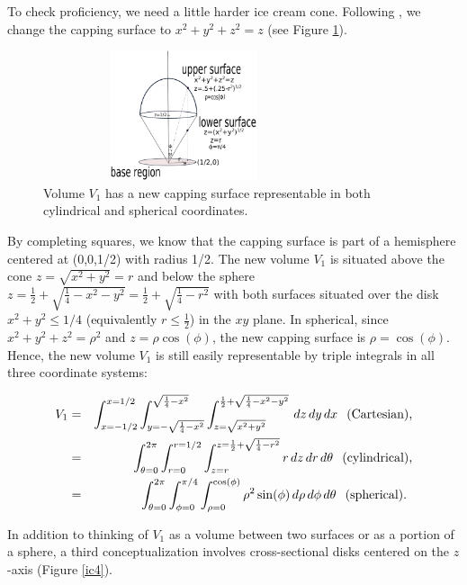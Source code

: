 \documentclass[12pt,fleqn]{article}
\begin{document}
To check proficiency, we need a little harder ice cream cone. Following  \cite{S}, we change the capping surface  to $x^2+y^2+z^2=z$ (see Figure \ref{ic3}).


\begin{figure}[h]
    \centering
        \includegraphics [width=3.25in, height=1.5in]{ic3.eps}
    \caption{Volume $V_1$ has a new capping surface representable in both cylindrical and spherical coordinates.}
    \label{ic3}
\end{figure}

{\flushleft By} completing squares, we know that the capping surface  is part of a hemisphere centered at (0,0,1/2) with radius 1/2.
The new volume $V_1$ is situated above the cone  $z=\sqrt{x^2+y^2}=r$ and below the sphere $z=\frac {1}{2}+\sqrt{\frac{1}{4}-x^2-y^2}=\frac{1}{2}+\sqrt{\frac{1}{4}-r^2}$ with both surfaces situated over the disk $x^2+y^2 \le 1/4$ (equivalently $r\le\frac{1}{2}$) in the $xy$ plane.
In spherical, since $x^2+y^2+z^2=\rho^2$ and $z=\rho\cos(\phi)$, the new capping surface is $\rho=\cos(\phi)$. Hence, the new volume $V_1$ is still easily representable by triple integrals in all three coordinate systems:

\begin{eqnarray}
V_1&=& \int_{x=-1/2}^{x=1/2} \int_{y=-\sqrt{\frac{1}{4}-x^2}}^{\sqrt{\frac{1}{4}-x^2}}\int_{z=\sqrt{x^2+y^2}}^{\frac {1}{2}+\sqrt{\frac{1}{4}-x^2-y^2}}\,dz\,dy\,dx \hspace{.1in} \textup{(Cartesian),} \nonumber\\
&=&\int_{\theta=0}^{2\pi}\int_{r=0}^{r=1/2} \int_{z=r}^{z=\frac {1}{2}+\sqrt{\frac{1}{4}-r^2}} r \,dz\,dr\,d\theta \hspace{.1in} \textup{(cylindrical),} \nonumber\\
 &=&\int_{\theta=0}^{2\pi}\int_{\phi=0}^{\pi/4} \int_{\rho=0}^{\cos(\phi)} \rho^2\sin(\phi) \,d\rho\,d\phi\,d\theta \hspace{.1in} \textup{(spherical). \label{eqn1}}
\end{eqnarray}

In addition to thinking of $V_1$ as a volume between two surfaces or as a portion of a sphere, a third conceptualization involves cross-sectional disks centered on the $z$-axis (Figure \ref{ic4}).
\end{document}
